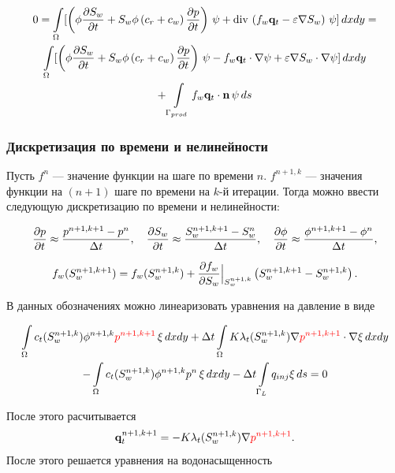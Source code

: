 \begin{multline}
	\displaystyle 0=\int\limits_\Omega  [\left(\phi \dfrac{\partial S_w}{\partial t} + S_w\phi\left(c_r + c_w \right)\dfrac{\partial p}{\partial t} \right)\,\psi + \operatorname{div}\, \left( f_w \mathbf{q}_t - \varepsilon \nabla S_w \right)\, \psi] \,dx dy = \\ 
	\int\limits_\Omega[\left(\phi \dfrac{\partial S_w}{\partial t} + S_w\phi\left(c_r + c_w \right)\dfrac{\partial p}{\partial t} \right)\,\psi -  f_w \mathbf{q}_t \cdot \nabla \psi +  \varepsilon \nabla S_w \cdot \nabla \psi] \,dx dy \\
	+\int\limits_{\Gamma_{prod}} f_w \mathbf{q}_t \cdot \mathbf{n} \,\psi \, ds
\end{multline}

\subsubsection{Дискретизация по времени и нелинейности}

Пусть $f^{n}$ --- значение функции на шаге по времени $n$. $f^{n+1,k}$ --- значения функции на $(n+1)$ шаге по времени на $k$-й итерации. Тогда можно ввести следующую дискретизацию по времени и нелинейности:

\begin{equation}
	\dfrac{\partial p}{\partial t} \approx \dfrac{p^{n+1, k+1}-p^{n}}{\Delta t}, \quad \dfrac{\partial S_w}{\partial t} \approx \dfrac{S_w^{n+1, k+1}-S_w^{n}}{\Delta t}, \quad \dfrac{\partial \phi}{\partial t} \approx \dfrac{\phi^{n+1, k+1}-\phi^{n}}{\Delta t},
\end{equation}

\begin{equation}
	f_w(S_w^{n+1, k+1}) = f_w(S_w^{n+1, k}) + \dfrac{\partial f_w}{\partial S_w}\Bigl|_{S_w^{n+1, k}}\Bigr. \left( S_w^{n+1, k+1} - S_w^{n+1, k} \right) .
\end{equation}

В данных обозначениях можно линеаризовать уравнения на давление в виде

\begin{multline}
	 \int\limits_\Omega c_t (S_w^{n+1, k})\phi^{n+1, k} {\color{red}p^{n+1, k+1}}\, \xi \,dx dy 
	 + \Delta t \int\limits_\Omega K \lambda_t (S_w^{n+1, k}) \nabla {\color{red}p^{n+1, k+1} }\cdot \nabla\xi \,dx dy \\ -\int\limits_\Omega c_t (S_w^{n+1, k})\phi^{n+1, k} p^{n}\, \xi \,dx dy-\Delta t \int\limits_{\Gamma_L} q_{inj} \xi \, ds=0
\end{multline}

После этого расчитывается 
\begin{equation}
	\mathbf{q}_t^{n+1, k+1} = -K\lambda_t (S_w^{n+1,k})\nabla {\color{red}p^{n+1, k+1} }.
\end{equation}
После этого решается уравнения на водонасыщенность

